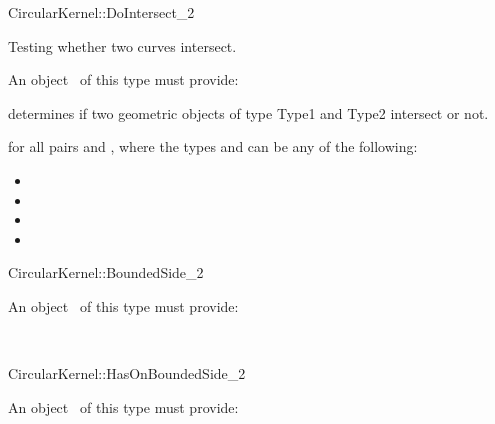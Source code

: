 \begin{ccRefFunctionObjectConcept}{CircularKernel::DoIntersect_2}

\ccDefinition

Testing whether two curves intersect.

\ccRefines



An object \ccVar\ of this type must provide:

{determines if two geometric objects of type Type1 and Type2 intersect or not.}

for all pairs  and , where the types 
 and  can be any of the following:
\begin{itemize}
\item {} 
\item {} 
\item {} 
\item {} 
\end{itemize} 

\ccSeeAlso


\end{ccRefFunctionObjectConcept}
\begin{ccRefFunctionObjectConcept}{CircularKernel::BoundedSide_2}

\ccRefines



An object \ccVar\ of this type must provide:

{}

\ccSeeAlso

\\

\end{ccRefFunctionObjectConcept}
\begin{ccRefFunctionObjectConcept}{CircularKernel::HasOnBoundedSide_2}

\ccRefines



An object \ccVar\ of this type must provide:

{}

\ccSeeAlso

\\

\end{ccRefFunctionObjectConcept}
